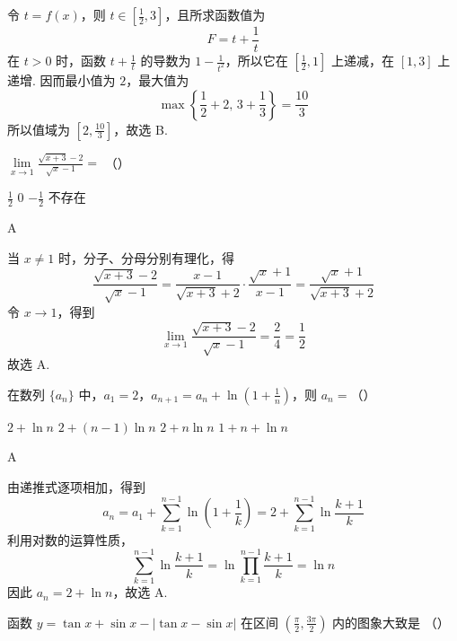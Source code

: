 \begin{solution}
令 \(t=f(x)\)，则 \(t\in\left[\frac12,3\right]\)，且所求函数值为
\[
F=t+\frac1t
\]
在 \(t>0\) 时，函数 \(t+\frac1t\) 的导数为 \(1-\frac1{t^2}\)，所以它在 \(\left[\frac12,1\right]\) 上递减，在 \([1,3]\) 上递增. 因而最小值为 \(2\)，最大值为
\[
\max\left\{\frac12+2,\,3+\frac13\right\}=\frac{10}{3}
\]
所以值域为 \(\left[2,\frac{10}{3}\right]\)，故选 B.
\end{solution}

\begin{problem}
\(\displaystyle \lim\limits_{x\to 1}\frac{\sqrt{x + 3} - 2}{\sqrt{x} - 1} =\) （\quad）

\choices
    {\( \frac{1}{2} \)}
    {\(0\)}
    {\(-\frac{1}{2}\)}
    {不存在}
\end{problem}

\begin{answer}
A
\end{answer}

\begin{solution}
当 \(x\ne1\) 时，分子、分母分别有理化，得
\[
\frac{\sqrt{x+3}-2}{\sqrt{x}-1}
=\frac{x-1}{\sqrt{x+3}+2}\cdot\frac{\sqrt{x}+1}{x-1}
=\frac{\sqrt{x}+1}{\sqrt{x+3}+2}
\]
令 \(x\to1\)，得到
\[
\lim_{x\to1}\frac{\sqrt{x+3}-2}{\sqrt{x}-1}=\frac{2}{4}=\frac12
\]
故选 A.
\end{solution}

\begin{problem}
在数列 \(\{a_{n}\}\) 中，\(a_{1} = 2\)，\(a_{n+1} = a_{n} + \ln \left(1 + \frac{1}{n}\right)\)，则 \(a_{n} =\)（\quad）

\choices
    {\(2 + \ln n\)}
    {\(2 + (n - 1)\ln n\)}
    {\(2 + n\ln n\)}
    {\(1 + n + \ln n\)}
\end{problem}

\begin{answer}
A
\end{answer}

\begin{solution}
由递推式逐项相加，得到
\[
a_n=a_1+\sum_{k=1}^{n-1}\ln\left(1+\frac1k\right)
=2+\sum_{k=1}^{n-1}\ln\frac{k+1}{k}
\]
利用对数的运算性质，
\[
\sum_{k=1}^{n-1}\ln\frac{k+1}{k}
=\ln\prod_{k=1}^{n-1}\frac{k+1}{k}=\ln n
\]
因此 \(a_n=2+\ln n\)，故选 A.
\end{solution}

\begin{problem}
函数 \( y = \tan x + \sin x - |\tan x - \sin x| \) 在区间 \(\left(\frac{\pi}{2}, \frac{3\pi}{2}\right)\) 内的图象大致是 （\quad）

    {}
    {}
    {}
\end{problem}

